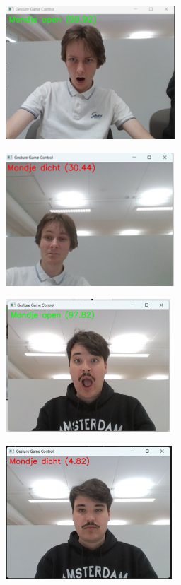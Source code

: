 \documentclass{report}
\begin{document}
\begin{figure}[H]
    \centering
    \begin{subfigure}[b]{0.45\linewidth}
        \centering
        \includegraphics[height=50mm, keepaspectratio]{report_images/ebbe_open.png}
    \end{subfigure}
    \hfill
    \begin{subfigure}[b]{0.45\linewidth}
        \centering
        \includegraphics[height=50mm, keepaspectratio]{report_images/ebbe_dicht.png}
    \end{subfigure}

    \vspace{0.5cm}

    \begin{subfigure}[b]{0.45\linewidth}
        \centering
        \includegraphics[height=50mm, keepaspectratio]{report_images/mathais_open.png}
    \end{subfigure}
    \hfill
    \begin{subfigure}[b]{0.45\linewidth}
        \centering
        \includegraphics[height=50mm, keepaspectratio]{report_images/mathias_dicht.png}
    \end{subfigure}


\end{figure}
\end{document}
